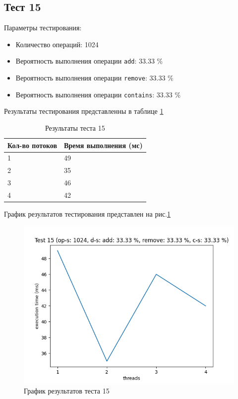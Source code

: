 \subsection*{Тест 15}

Параметры тестирования:

\begin{itemize}
    \item Количество операций: 1024
    \item Вероятность выполнения операции \verb|add|: 33.33 \%
    \item Вероятность выполнения операции \verb|remove|: 33.33 \%
    \item Вероятность выполнения операции \verb|contains|: 33.33 \%
\end{itemize}

Результаты тестирования представленны в таблице \ref{tab:results15}


\begin{table}[H]
    \centering
    \begin{tabular}{|l|l|}
        \hline
        Кол-во потоков & Время выполнения (мс) \\
        \hline
        1 & 49 \\
        \hline
        2 & 35 \\
        \hline
        3 & 46 \\
        \hline
        4 & 42 \\
        \hline
    \end{tabular}
    \caption{Результаты теста 15}
    \label{tab:results15}
\end{table}
        

График результатов тестирования представлен на рис.\ref{fig:plot15}

\begin{figure}[H]
    \centering
    \includegraphics[width=0.7\linewidth]{photo/plot15}
    \caption{График результатов теста 15}
    \label{fig:plot15}
\end{figure}

